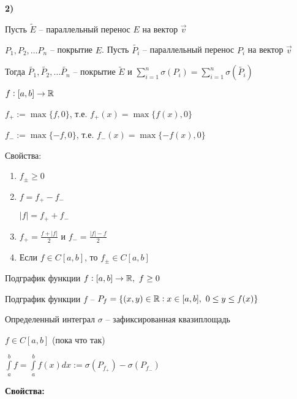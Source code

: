 \documentclass[12pt]{article}
\begin{document}
\textbf{2)}

Пусть $\tilde{E}$ -- параллельный перенос $E$ на вектор $\overrightarrow{v}$

$P_1, P_2, \ldots P_n$ -- покрытие $E$. Пусть $\tilde{P_i}$ -- параллельный перенос $P_i$ на вектор $\overrightarrow{v}$

Тогда $\tilde{P_1}, \tilde{P_2}, \ldots \tilde{P_n}$ -- покрытие $\tilde{E}$ и $\sum\limits_{i = 1}^n \sigma(P_i) = \sum\limits_{i = 1}^n \sigma(\tilde{P_i})$

\begin{defin}{}
    $f : [a, b] \rightarrow \mathbb R$

    $f_+ := \max\{f, 0\}$, т.е. $f_+(x) = \max\{f(x), 0\}$

    $f_- := \max\{-f, 0\}$, т.е. $f_-(x) = \max\{-f(x), 0\}$

    Свойства:

    \begin{enumerate}
        \item $f_\pm \geq 0$
        \item $f = f_+ - f_-$
        
        $|f| = f_+ + f_-$

        \item $f_+ = \frac{f + |f|}{2}$ и $f_- = \frac{|f| - f}{2}$
        \item Если $f \in C[a, b]$, то $f_\pm \in C[a, b]$
    \end{enumerate}
\end{defin}

\begin{defin}{Подграфик функции}
    $f : [a, b] \rightarrow \mathbb R,\ f \geq 0$

    Подграфик функции $f$ -- $P_f = \{ (x, y) \in \mathbb R : x \in [a, b],\ 0 \leq y \leq f(x) \}$
\end{defin}

\begin{defin}{Определенный интеграл}
    $\sigma$ -- зафиксированная квазиплощадь

    $f \in C[a, b]$ (пока что так)

    $\int\limits_a^b f = \int\limits_a^b f(x)dx  := \sigma(P_{f_+}) - \sigma(P_{f_-})$
\end{defin}

\textbf{Свойства:}
\end{document}
